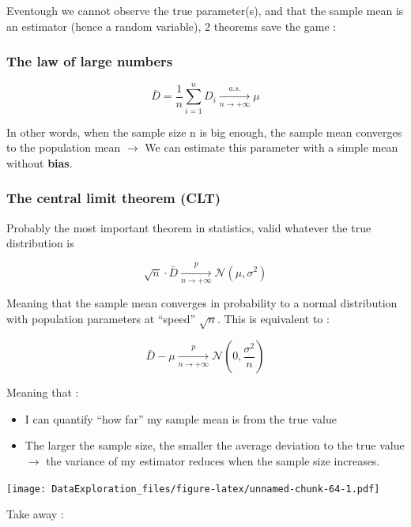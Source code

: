 \documentclass[
]{book}
\providecommand{\tightlist}{%
  \setlength{\itemsep}{0pt}\setlength{\parskip}{0pt}}
\begin{document}
Eventough we cannot observe the true parameter(s), and that the sample mean is an estimator (hence a random variable), 2 theorems save the game :

\hypertarget{the-law-of-large-numbers}{%
\subsubsection{The law of large numbers}\label{the-law-of-large-numbers}}

\[\bar{D} = \dfrac{1}{n} \sum_{i=1}^n D_i \xrightarrow[n \to +\infty]{a.s.} \mu\]

In other words, when the sample size n is big enough, the sample mean converges to the population mean \(\rightarrow\) We can estimate this parameter with a simple mean without \textbf{bias}.

\hypertarget{the-central-limit-theorem-clt}{%
\subsubsection{The central limit theorem (CLT)}\label{the-central-limit-theorem-clt}}

Probably the most important theorem in statistics, valid whatever the true distribution is

\[\sqrt{n} \cdot \bar{D} \xrightarrow[n \to +\infty]{p}  \mathcal{N} (\mu,\sigma^2)\]

Meaning that the sample mean converges in probability to a normal distribution with population parameters at ``speed'' \(\sqrt{n}\). This is equivalent to :

\[ \bar{D} - \mu \xrightarrow[n \to +\infty]{p}  \mathcal{N} (0,\frac{\sigma^2}{n})\]

Meaning that :

\begin{itemize}
\tightlist
\item
  I can quantify ``how far'' my sample mean is from the true value
\item
  The larger the sample size, the smaller the average deviation to the true value \(\rightarrow\) the variance of my estimator reduces when the sample size increases.
\end{itemize}

\texttt{[image: DataExploration\_files/figure-latex/unnamed-chunk-64-1.pdf]}

Take away :
\end{document}
